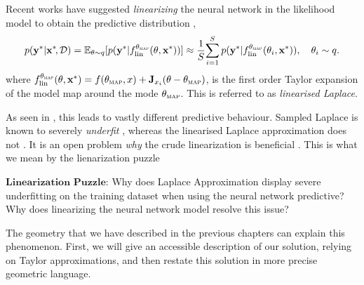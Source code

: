 Recent works have suggested \emph{linearizing} the neural network in the likelihood model to obtain the predictive distribution \citep{immer2021improving},
\begin{align}
    p(\mathbf{y}^*|\mathbf{x}^*\!, \mathcal{D}) = \mathbb{E}_{\theta\sim q}[p(\mathbf{y}^*|f^{\theta_{\textsc{map}}}_{\mathrm{lin}}(\theta, \mathbf{x}^*))] %
                            \approx \frac{1}{S}\! \sum_{i=1}^S p(\mathbf{y}^*|f^{\theta_{\textsc{map}}}_{\mathrm{lin}}(\theta_i, \mathbf{x}^*)), \quad \theta_i \sim q.
\end{align}
where $f^{\theta_{\textsc{map}}}_{\mathrm{lin}}(\theta, \mathbf{x}^*) = f (\theta_{\textsc{map}}, x) + \mathbf{J}_{x_i} (\theta - \theta_{\textsc{map}})$, is the first order Taylor expansion of the model map around the mode $\theta_{\textsc{map}}$. This is referred to as \emph{linearised Laplace}. 

As seen in , this leads to vastly different predictive behaviour. Sampled Laplace is known to severely \emph{underfit} \citep{lawrence2001variational, immer2021scalable}, whereas the linearised Laplace approximation does not \citealt{immer2021improving}. It is an open problem \emph{why} the crude linearization is beneficial \citep{papamarkou2024position}. This is what we mean by the lienarization puzzle


\begin{mdframed}[backgroundcolor=myblue, linecolor=blue!75!black]
  $\textbf{Linearization Puzzle:} $ Why does Laplace Approximation display severe underfitting on the training dataset when using the neural network predictive? Why does linearizing the neural network model resolve this issue?

\end{mdframed}

The geometry that we have described in the previous chapters can explain this phenomenon. First, we will give an accessible description of our solution, relying on Taylor approximations, and then restate this solution in more precise geometric language. 


